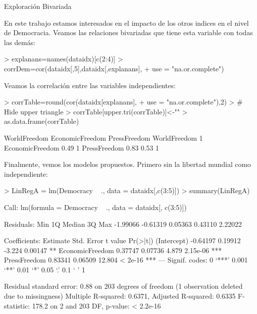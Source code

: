 \documentclass{article}
\begin{document}
Exploración Bivariada

En este trabajo estamos interesados en el impacto de los otros indices en el nivel de Democracia. Veamos las relaciones bivariadas que tiene esta variable con todas las demás:
\begin{Schunk}
\begin{Sinput}
> explanans=names(dataidx)[c(2:4)]
> corrDem=cor(dataidx[,5],dataidx[,explanans],
+     use = "na.or.complete")
\end{Sinput}
\end{Schunk}




Veamos la correlación entre las variables independientes:

\begin{Schunk}
\begin{Sinput}
> corrTable=round(cor(dataidx[explanans],
+                use = "na.or.complete"),2)
> # Hide upper triangle
> corrTable[upper.tri(corrTable)]<-""
> as.data.frame(corrTable)
\end{Sinput}
\begin{Soutput}
                WorldFreedom EconomicFreedom PressFreedom
WorldFreedom               1                             
EconomicFreedom         0.49               1             
PressFreedom            0.83            0.53            1
\end{Soutput}
\end{Schunk}


Finalmente, vemos los modelos propuestos. Primero sin la libertad mundial como independiente:
\begin{Schunk}
\begin{Sinput}
> LinRegA = lm(Democracy ~ ., data = dataidx[,c(3:5)])
> summary(LinRegA)
\end{Sinput}
\begin{Soutput}
Call:
lm(formula = Democracy ~ ., data = dataidx[, c(3:5)])

Residuals:
     Min       1Q   Median       3Q      Max 
-1.99066 -0.61319  0.05363  0.43110  2.22022 

Coefficients:
                Estimate Std. Error t value Pr(>|t|)    
(Intercept)     -0.64197    0.19912  -3.224  0.00147 ** 
EconomicFreedom  0.37747    0.07736   4.879 2.15e-06 ***
PressFreedom     0.83341    0.06509  12.804  < 2e-16 ***
---
Signif. codes:  0 ‘***’ 0.001 ‘**’ 0.01 ‘*’ 0.05 ‘.’ 0.1 ‘ ’ 1

Residual standard error: 0.88 on 203 degrees of freedom
  (1 observation deleted due to missingness)
Multiple R-squared:  0.6371,	Adjusted R-squared:  0.6335 
F-statistic: 178.2 on 2 and 203 DF,  p-value: < 2.2e-16
\end{Soutput}
\end{Schunk}
\end{document}
